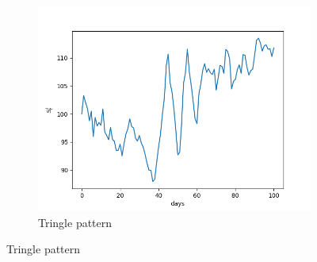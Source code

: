 \documentclass[11pt]{article}
\begin{document}
\begin{figure}
  \begin{subfigure}{.5\textwidth}
    \centering    
    \includegraphics[width=.8\linewidth]{image_0.png}
    \caption{Tringle pattern}    
  \end{subfigure}
\end{figure}
\end{document}

